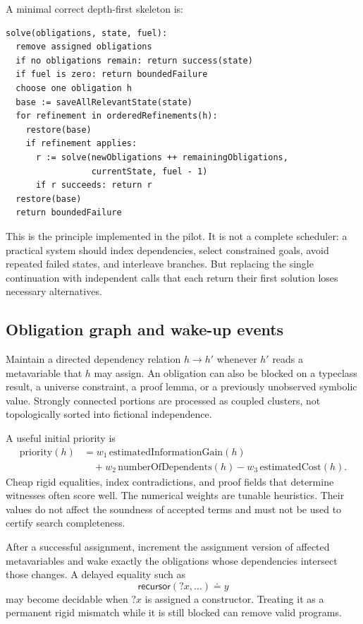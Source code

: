 \documentclass[11pt,a4paper]{article}
\theoremstyle{remark}
\begin{document}
A minimal correct depth-first skeleton is:
\begin{lstlisting}
solve(obligations, state, fuel):
  remove assigned obligations
  if no obligations remain: return success(state)
  if fuel is zero: return boundedFailure
  choose one obligation h
  base := saveAllRelevantState(state)
  for refinement in orderedRefinements(h):
    restore(base)
    if refinement applies:
      r := solve(newObligations ++ remainingObligations,
                 currentState, fuel - 1)
      if r succeeds: return r
  restore(base)
  return boundedFailure
\end{lstlisting}

This is the principle implemented in the pilot. It is not a complete scheduler: a practical system should index dependencies, select constrained goals, avoid repeated failed states, and interleave branches. But replacing the single continuation with independent calls that each return their first solution loses necessary alternatives.

\subsection{Obligation graph and wake-up events}

Maintain a directed dependency relation $h\to h'$ whenever $h'$ reads a metavariable that $h$ may assign. An obligation can also be blocked on a typeclass result, a universe constraint, a proof lemma, or a previously unobserved symbolic value. Strongly connected portions are processed as coupled clusters, not topologically sorted into fictional independence.

A useful initial priority is
\[
\begin{aligned}
 \mathrm{priority}(h)&= w_1\,\mathrm{estimatedInformationGain}(h)\\
 &\quad +w_2\,\mathrm{numberOfDependents}(h)
 -w_3\,\mathrm{estimatedCost}(h).
\end{aligned}
\]
Cheap rigid equalities, index contradictions, and proof fields that determine witnesses often score well. The numerical weights are tunable heuristics. Their values do not affect the soundness of accepted terms and must not be used to certify search completeness.

After a successful assignment, increment the assignment version of affected metavariables and wake exactly the obligations whose dependencies intersect those changes. A delayed equality such as
\[
 \mathsf{recursor}(?x,\ldots)\doteq y
\]
may become decidable when $?x$ is assigned a constructor. Treating it as a permanent rigid mismatch while it is still blocked can remove valid programs.
\end{document}
